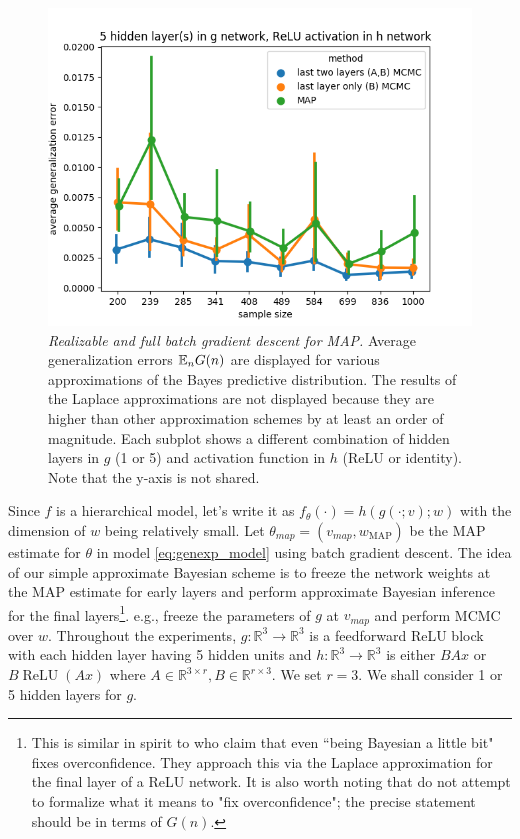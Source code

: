 \documentclass{article} %
\begin{document}
\begin{figure}[h!]
\begin{center}
		\includegraphics[scale=0.35]{taskid11.png}
	\end{center}
	\caption{\textit{Realizable and full batch gradient descent for MAP.} Average generalization errors $\mathbb{E}_n G(n)$ are displayed for various approximations of the Bayes predictive distribution. The results of the Laplace approximations are not displayed because they are higher than other approximation schemes by at least an order of magnitude. Each subplot shows a different combination of hidden layers in $g$ (1 or 5) and activation function in $h$ (ReLU or identity). Note that the y-axis is not shared.
	}
	\label{fig:avg_gen_err_fullbatch_realizable}
\end{figure}




 Since $f$ is a hierarchical model, let's write it as $f_\theta(\cdot) = h(g(\cdot;v);w)$ with the dimension of $w$ being relatively small. Let $\theta_{map} = (v_{map}, w_{\operatorname{MAP}})$ be the MAP estimate for $\theta$ in model \ref{eq:genexp_model} using batch gradient descent. The idea of our simple approximate Bayesian scheme is to freeze the network weights at the MAP estimate for early layers and perform approximate Bayesian inference for the final layers\footnote{This is similar in spirit to \citet{kristiadi_being_2020} who claim that even ``being Bayesian a little bit" fixes overconfidence. They approach this via the Laplace approximation for the final layer of a ReLU network. It is also worth noting that \citet{kristiadi_being_2020} do not attempt to formalize what it means to "fix overconfidence"; the precise statement should be in terms of $G(n)$.}. e.g., freeze the parameters of $g$ at $v_{map}$ and perform MCMC over $w$. 
Throughout the experiments, $g: \mathbb R^3 \to \mathbb R^3$ is a feedforward ReLU block with each hidden layer having 5 hidden units and $h: \mathbb R^3 \to \mathbb R^3$ is either $BAx$ or $B \operatorname{ReLU}(Ax)$ where $A \in \mathbb R^{3 \times r}, B \in \mathbb R^{r \times 3}$. We set $r=3$. We shall consider 1 or 5 hidden layers for $g$. 
\end{document}
